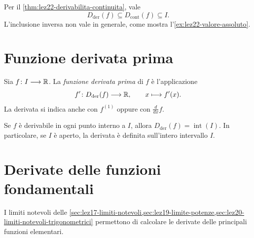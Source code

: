 Per il \cref{thm:lez22-derivabilita-continuita}, vale
\[
  D_{\mathrm{der}}(f)\subseteq D_{\mathrm{cont}}(f)
  \subseteq I.
\]
L'inclusione inversa non vale in generale, come
mostra l'\cref{ex:lez22-valore-assoluto}.

\section{Funzione derivata prima}
\label{sec:lez22-funzione-derivata}

\begin{definition}
\label{def:lez22-funzione-derivata}
Sia \(f\colon I\longrightarrow\mathbb{R}\). La
\emph{funzione derivata prima} di \(f\) è
l'applicazione
\[
  f'\colon D_{\mathrm{der}}(f)\longrightarrow\mathbb{R},
  \qquad x\longmapsto f'(x).
\]
La derivata si indica anche con \(f^{(1)}\) oppure
con \(\frac{d}{dx}f\).
\end{definition}

Se \(f\) è derivabile in ogni punto interno a \(I\),
allora \(D_{\mathrm{der}}(f)=\operatorname{int}(I)\).
In particolare, se \(I\) è aperto, la derivata è
definita sull'intero intervallo \(I\).

\section{Derivate delle funzioni fondamentali}
\label{sec:lez22-derivate-fondamentali}

I limiti notevoli delle
\cref{sec:lez17-limiti-notevoli,sec:lez19-limite-potenze,sec:lez20-limiti-notevoli-trigonometrici}
permettono di calcolare le derivate delle principali
funzioni elementari.

